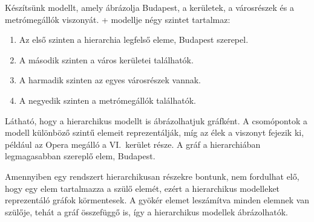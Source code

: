 Készítsünk modellt, amely ábrázolja Budapest, a kerületek, a városrészek és a metrómegállók viszonyát. \Az+ modellje négy szintet tartalmaz:

\begin{enumerate}
	\item Az első szinten a hierarchia legfelső eleme, Budapest szerepel.
	\item A második szinten a város kerületei találhatók.
	\item A harmadik szinten az egyes városrészek vannak.
	\item A negyedik szinten a metrómegállók találhatók.
\end{enumerate}

Látható, hogy a hierarchikus modellt is ábrázolhatjuk gráfként. A csomópontok a modell különböző szintű elemeit reprezentálják, míg az élek a  viszonyt fejezik ki, például az Opera megálló a VI.~kerület része. A gráf  a hierarchiában legmagasabban szereplő elem, Budapest.

Amennyiben egy rendszert hierarchikusan részekre bontunk, nem fordulhat elő, hogy egy elem tartalmazza a szülő elemét, ezért a hierarchikus modelleket reprezentáló gráfok körmentesek. A gyökér elemet leszámítva minden elemnek van szülője, tehát a gráf összefüggő is, így a hierarchikus modellek  ábrázolhatók.

%


